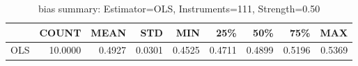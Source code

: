 \begin{table}[ht]
\centering
\caption{bias summary: Estimator=OLS, Instruments=111, Strength=0.50}
\begin{tabular}{lrrrrrrrr}
\toprule
 & COUNT & MEAN & STD & MIN & 25\% & 50\% & 75\% & MAX \\
\midrule
OLS & 10.0000 & 0.4927 & 0.0301 & 0.4525 & 0.4711 & 0.4899 & 0.5196 & 0.5369 \\
\bottomrule
\end{tabular}
\end{table}
